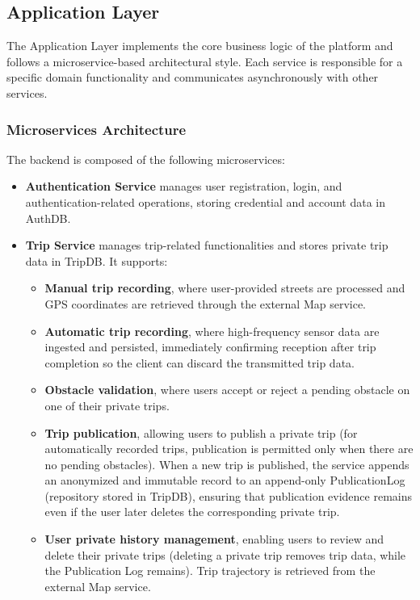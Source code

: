 \subsection{Application Layer}
The Application Layer implements the core business logic of the platform and follows a microservice-based architectural style. Each service is responsible for a specific domain functionality and communicates asynchronously with other services.

\subsubsection{Microservices Architecture}
The backend is composed of the following microservices:

\begin{itemize}
    \item \textbf{Authentication Service} manages user registration, login, and authentication-related operations, storing credential and account data in AuthDB.
    
    \item \textbf{Trip Service} manages trip-related functionalities and stores private trip data in TripDB. It supports:
    \begin{itemize}
        \item \textbf{Manual trip recording}, where user-provided streets are processed and GPS coordinates are retrieved through the external Map service.
        \item \textbf{Automatic trip recording}, where high-frequency sensor data are ingested and persisted, immediately confirming reception after trip completion so the client can discard the transmitted trip data.
        \item \textbf{Obstacle validation}, where users accept or reject a pending obstacle on one of their private trips.
        \item \textbf{Trip publication}, allowing users to publish a private trip (for automatically recorded trips, publication is permitted only when there are no pending obstacles). When a new trip is published, the service appends an anonymized and immutable record to an append-only PublicationLog (repository stored in TripDB), ensuring that publication evidence remains even if the user later deletes the corresponding private trip.
        \item \textbf{User private history management}, enabling users to review and delete their private trips (deleting a private trip removes trip data, while the Publication Log remains). Trip trajectory is retrieved from the external Map service.
    \end{itemize}
    

\end{itemize}

